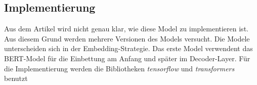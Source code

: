 \subsection{Implementierung}

Aus dem Artikel wird nicht genau klar, wie diese Model zu implementieren ist. Aus diesem Grund werden mehrere Versionen des Models versucht. Die Modele unterscheiden sich in der Embedding-Strategie. Das erste Model verwendent das BERT-Model für die Einbettung am Anfang und später im Decoder-Layer. Für die Implementierung werden die Bibliotheken \textit{tensorflow} und \textit{transformers} benutzt

